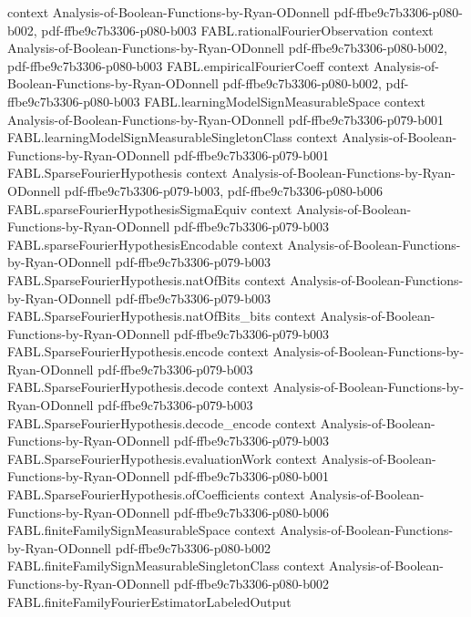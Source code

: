 \begin{theorem}
  {context}
  {Analysis-of-Boolean-Functions-by-Ryan-ODonnell}
  {pdf-ffbe9c7b3306-p080-b002,
    pdf-ffbe9c7b3306-p080-b003}
\proofstep
  {FABL.rationalFourierObservation}
  {context}
  {Analysis-of-Boolean-Functions-by-Ryan-ODonnell}
  {pdf-ffbe9c7b3306-p080-b002,
    pdf-ffbe9c7b3306-p080-b003}
\proofstep
  {FABL.empiricalFourierCoeff}
  {context}
  {Analysis-of-Boolean-Functions-by-Ryan-ODonnell}
  {pdf-ffbe9c7b3306-p080-b002,
    pdf-ffbe9c7b3306-p080-b003}
\proofstep
  {FABL.learningModelSignMeasurableSpace}
  {context}
  {Analysis-of-Boolean-Functions-by-Ryan-ODonnell}
  {pdf-ffbe9c7b3306-p079-b001}
\proofstep
  {FABL.learningModelSignMeasurableSingletonClass}
  {context}
  {Analysis-of-Boolean-Functions-by-Ryan-ODonnell}
  {pdf-ffbe9c7b3306-p079-b001}
\proofstep
  {FABL.SparseFourierHypothesis}
  {context}
  {Analysis-of-Boolean-Functions-by-Ryan-ODonnell}
  {pdf-ffbe9c7b3306-p079-b003,
    pdf-ffbe9c7b3306-p080-b006}
\proofstep
  {FABL.sparseFourierHypothesisSigmaEquiv}
  {context}
  {Analysis-of-Boolean-Functions-by-Ryan-ODonnell}
  {pdf-ffbe9c7b3306-p079-b003}
\proofstep
  {FABL.sparseFourierHypothesisEncodable}
  {context}
  {Analysis-of-Boolean-Functions-by-Ryan-ODonnell}
  {pdf-ffbe9c7b3306-p079-b003}
\proofstep
  {FABL.SparseFourierHypothesis.natOfBits}
  {context}
  {Analysis-of-Boolean-Functions-by-Ryan-ODonnell}
  {pdf-ffbe9c7b3306-p079-b003}
\proofstep
  {FABL.SparseFourierHypothesis.natOfBits_bits}
  {context}
  {Analysis-of-Boolean-Functions-by-Ryan-ODonnell}
  {pdf-ffbe9c7b3306-p079-b003}
\proofstep
  {FABL.SparseFourierHypothesis.encode}
  {context}
  {Analysis-of-Boolean-Functions-by-Ryan-ODonnell}
  {pdf-ffbe9c7b3306-p079-b003}
\proofstep
  {FABL.SparseFourierHypothesis.decode}
  {context}
  {Analysis-of-Boolean-Functions-by-Ryan-ODonnell}
  {pdf-ffbe9c7b3306-p079-b003}
\proofstep
  {FABL.SparseFourierHypothesis.decode_encode}
  {context}
  {Analysis-of-Boolean-Functions-by-Ryan-ODonnell}
  {pdf-ffbe9c7b3306-p079-b003}
\proofstep
  {FABL.SparseFourierHypothesis.evaluationWork}
  {context}
  {Analysis-of-Boolean-Functions-by-Ryan-ODonnell}
  {pdf-ffbe9c7b3306-p080-b001}
\proofstep
  {FABL.SparseFourierHypothesis.ofCoefficients}
  {context}
  {Analysis-of-Boolean-Functions-by-Ryan-ODonnell}
  {pdf-ffbe9c7b3306-p080-b006}
\proofstep
  {FABL.finiteFamilySignMeasurableSpace}
  {context}
  {Analysis-of-Boolean-Functions-by-Ryan-ODonnell}
  {pdf-ffbe9c7b3306-p080-b002}
\proofstep
  {FABL.finiteFamilySignMeasurableSingletonClass}
  {context}
  {Analysis-of-Boolean-Functions-by-Ryan-ODonnell}
  {pdf-ffbe9c7b3306-p080-b002}
\proofstep
  {FABL.finiteFamilyFourierEstimatorLabeledOutput}

\end{theorem}
